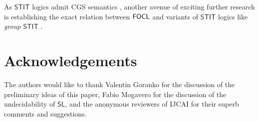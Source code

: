 \documentclass{article}
\begin{document}
As $\mathsf{STIT}$ logics \cite{horty01} admit CGS semantics \cite{boudou18,broersen15}, another avenue of exciting further research is establishing the exact relation between $\mathsf{FOCL}$ and variants of $\mathsf{STIT}$ logics like \textit{group} $\mathsf{STIT}$ \cite{herzig08,lorini11}.

\section*{Acknowledgements}
The authors would like to thank Valentin Goranko for the discussion of the preliminary ideas of this paper, Fabio Mogavero for the discussion of the undecidability of $\mathsf{SL}$, and the anonymous reviewers of IJCAI for their superb comments and suggestions.   





%
%
\end{document}
